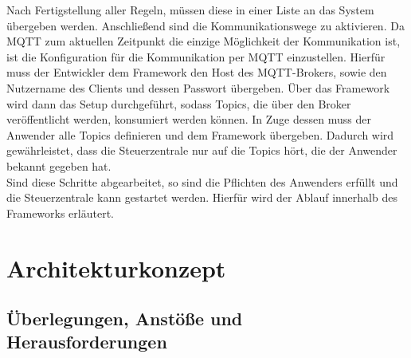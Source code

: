         Nach Fertigstellung aller Regeln, müssen diese in einer Liste an das System übergeben werden. Anschließend sind die Kommunikationswege 
        zu aktivieren. 
        Da \acs{MQTT} zum aktuellen Zeitpunkt die einzige Möglichkeit der Kommunikation ist, ist die Konfiguration für die 
        Kommunikation per \acs{MQTT} einzustellen. Hierfür muss der Entwickler 
        dem Framework den Host des \acs{MQTT}-Brokers, sowie den Nutzername des Clients und dessen Passwort übergeben. Über das 
        Framework wird dann das Setup durchgeführt, sodass Topics, die über den Broker veröffentlicht werden, konsumiert werden können. 
        In Zuge dessen muss der Anwender alle Topics definieren und dem Framework übergeben. Dadurch wird gewährleistet, dass die 
        Steuerzentrale nur auf die Topics hört, die der Anwender bekannt gegeben hat. 
        \\
        Sind diese Schritte abgearbeitet, so sind die Pflichten des Anwenders erfüllt und die Steuerzentrale kann gestartet werden. 
        Hierfür wird der Ablauf innerhalb des Frameworks erläutert.
        \\
        \linebreak
        




\section{Architekturkonzept}
\label{sec:architekturkonzept}

    \subsection{Überlegungen, Anstöße und Herausforderungen}


